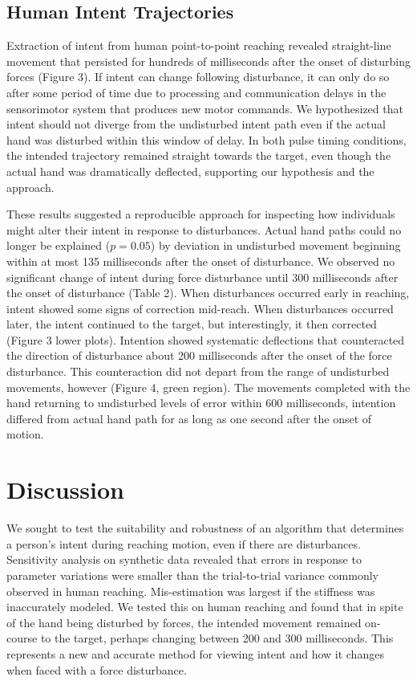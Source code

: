 \documentclass[10pt]{article}
\begin{document}
\subsection*{Human Intent Trajectories}
Extraction of intent from human point-to-point reaching revealed straight-line movement that persisted for hundreds of milliseconds after the onset of disturbing forces (Figure 3). If intent can change following disturbance, it can only do so after some period of time due to processing and communication delays in the sensorimotor system that produces new motor commands. We hypothesized that intent should not diverge from the undisturbed intent path even if the actual hand was disturbed within this window of delay. In both pulse timing conditions, the intended trajectory remained straight towards the target, even though the actual hand was dramatically deflected, supporting our hypothesis and the approach. 

These results suggested a reproducible approach for inspecting how individuals might alter their intent in response to disturbances. Actual hand paths could no longer be explained ($p=0.05$) by deviation in undisturbed movement beginning within at most 135 milliseconds after the onset of disturbance. We observed no significant change of intent during force disturbance until 300 milliseconds after the onset of disturbance (Table 2). When disturbances occurred early in reaching, intent showed some signs of correction mid-reach. When disturbances occurred later, the intent continued to the target, but interestingly, it then corrected (Figure 3 lower plots). Intention showed systematic deflections that counteracted the direction of disturbance about 200 milliseconds after the onset of the force disturbance. This counteraction did not depart from the range of undisturbed movements, however (Figure 4, green region). The movements completed with the hand returning to undisturbed levels of error within 600 milliseconds, intention differed from actual hand path for as long as one second after the onset of motion.  



\section*{Discussion}
We sought to test the suitability and robustness of an algorithm that determines a person's intent during reaching motion, even if there are disturbances. Sensitivity analysis on synthetic data revealed that errors in response to parameter variations were smaller than the trial-to-trial variance commonly observed in human reaching. Mis-estimation was largest if the stiffness was inaccurately modeled. We tested this on human reaching and found that in spite of the hand being disturbed by forces, the intended movement remained on-course to the target, perhaps changing between 200 and 300 milliseconds. This represents a new and accurate method for viewing intent and how it changes when faced with a force disturbance.
\end{document}

